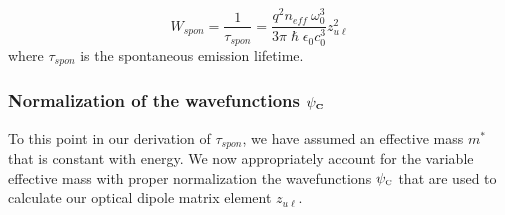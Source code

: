 {\begin{equation}
\label{chpt1eqn:tspon}
W_\textit{spon}=\frac{1}{\tau_\textit{spon}}=\frac{q^2 n_\textit{eff} \: \omega_0^3}{3 \pi \hslash \epsilon_0 c_0^3} z_{u\ell}^2
\end{equation}
where $\tau_\textit{spon}$ is the spontaneous emission lifetime.

\subsubsection{Normalization of the wavefunctions $\mathbf{\psi}_{\textnormal{\tiny{\textbf{C}}}}$}

To this point in our derivation of $\tau_\textit{spon}$, we have assumed an effective mass $m^*$ that is constant with energy.  We now appropriately account for the variable effective mass with proper normalization the wavefunctions $\psi_{\textnormal{\tiny{C}}}$ that are used to calculate our optical dipole matrix element $z_{u\ell}$.

}

